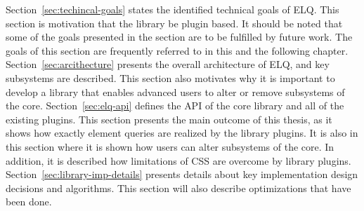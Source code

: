 \documentclass[a4paper,11pt]{kth-mag}
\begin{document}
    Section~\ref{sec:techincal-goals} states the identified technical goals of \gls{ELQ}.
    This section is motivation that the library be plugin based.
    It should be noted that some of the goals presented in the section are to be fulfilled by future work.
    The goals of this section are frequently referred to in this and the following chapter.
    Section~\ref{sec:arcithecture} presents the overall architecture of \gls{ELQ}, and key subsystems are described.
    This section also motivates why it is important to develop a library that enables advanced users to alter or remove subsystems of the core.
    Section~\ref{sec:elq-api} defines the \gls{API} of the core library and all of the existing plugins.
    This section presents the main outcome of this thesis, as it shows how exactly element queries are realized by the library plugins.
    It is also in this section where it is shown how users can alter subsystems of the core.
    In addition, it is described how limitations of \gls{CSS} are overcome by library plugins.
    Section~\ref{sec:library-imp-details} presents details about key implementation design decisions and algorithms.
    This section will also describe optimizations that have been done.


\end{document}
